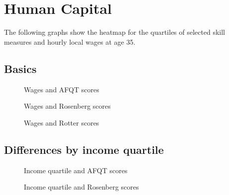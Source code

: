 \FloatBarrier\section{Human Capital}
The following graphs show the heatmap for the quartiles of selected skill measures and hourly local wages at age 35.

\FloatBarrier\subsection{Basics}
\begin{figure}[htp]\centering
\caption{Wages and AFQT scores}
\end{figure}

\begin{figure}[htp]\centering
\caption{Wages and Rosenberg scores}
\end{figure}

\begin{figure}[htp]\centering
\caption{Wages and Rotter scores}
\end{figure}
\FloatBarrier\subsection{Differences by income quartile}
\begin{figure}[htp]\centering
\caption{Income quartile and AFQT scores}
\end{figure}

\begin{figure}[htp]\centering
\caption{Income quartile and Rosenberg scores}
\end{figure}

